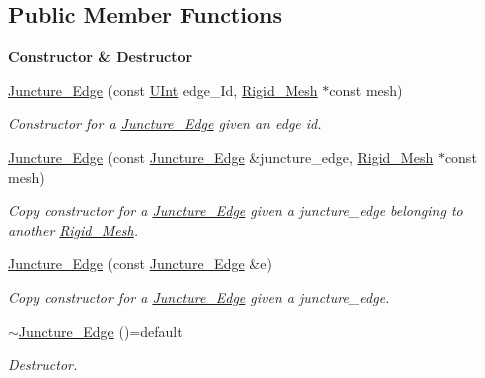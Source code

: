 \subsection*{Public Member Functions}
\begin{Indent}{\bf Constructor \& Destructor}\par
\begin{DoxyCompactItemize}
\item 
\hyperlink{classFVCode3D_1_1Rigid__Mesh_1_1Juncture__Edge_a112ccdf65501c4f65a842acaa42ee3dc}{Juncture\+\_\+\+Edge} (const \hyperlink{namespaceFVCode3D_a4bf7e328c75d0fd504050d040ebe9eda}{U\+Int} edge\+\_\+\+Id, \hyperlink{classFVCode3D_1_1Rigid__Mesh}{Rigid\+\_\+\+Mesh} $\ast$const mesh)
\begin{DoxyCompactList}\small\item\em Constructor for a \hyperlink{classFVCode3D_1_1Rigid__Mesh_1_1Juncture__Edge}{Juncture\+\_\+\+Edge} given an edge id. \end{DoxyCompactList}\item 
\hyperlink{classFVCode3D_1_1Rigid__Mesh_1_1Juncture__Edge_a75ded09afc11f444ed462eb156d6e664}{Juncture\+\_\+\+Edge} (const \hyperlink{classFVCode3D_1_1Rigid__Mesh_1_1Juncture__Edge}{Juncture\+\_\+\+Edge} \&juncture\+\_\+edge, \hyperlink{classFVCode3D_1_1Rigid__Mesh}{Rigid\+\_\+\+Mesh} $\ast$const mesh)
\begin{DoxyCompactList}\small\item\em Copy constructor for a \hyperlink{classFVCode3D_1_1Rigid__Mesh_1_1Juncture__Edge}{Juncture\+\_\+\+Edge} given a juncture\+\_\+edge belonging to another \hyperlink{classFVCode3D_1_1Rigid__Mesh}{Rigid\+\_\+\+Mesh}. \end{DoxyCompactList}\item 
\hyperlink{classFVCode3D_1_1Rigid__Mesh_1_1Juncture__Edge_a9bed6942bb3820a672c79e4618b4ac0d}{Juncture\+\_\+\+Edge} (const \hyperlink{classFVCode3D_1_1Rigid__Mesh_1_1Juncture__Edge}{Juncture\+\_\+\+Edge} \&e)
\begin{DoxyCompactList}\small\item\em Copy constructor for a \hyperlink{classFVCode3D_1_1Rigid__Mesh_1_1Juncture__Edge}{Juncture\+\_\+\+Edge} given a juncture\+\_\+edge. \end{DoxyCompactList}\item 
\hyperlink{classFVCode3D_1_1Rigid__Mesh_1_1Juncture__Edge_aad976db9c9f8808f096353440b428178}{$\sim$\+Juncture\+\_\+\+Edge} ()=default
\begin{DoxyCompactList}\small\item\em Destructor. \end{DoxyCompactList}\end{DoxyCompactItemize}
\end{Indent}
